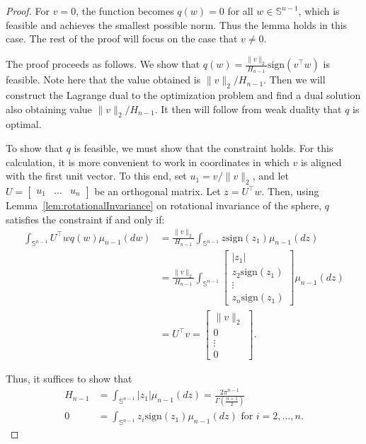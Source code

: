 \documentclass[twoside]{article}
\theoremstyle{definition}
\renewcommand{\S}{\mathbb{S}}
\newcommand{\sign}{\mathrm{sign}}
\newcommand{\1}[1]{\scalebox{1.25}{$\mathds{1}$}\left[#1\right]}
\begin{document}
\begin{proof}
For $v=0$, the function becomes $q(w)=0$ for all $w\in \S^{n-1}$, which is feasible and achieves the smallest possible norm. Thus the lemma holds in this case. The rest of the proof will focus on the case that $v\ne 0$.

The proof proceeds as follows. We show that $q(w)=\frac{\|v\|_2}{H_{n-1}}\sign(v^\top w)$ is feasible. Note  here that the value obtained is $\|v\|_2/H_{n-1}.$ Then we will construct the Lagrange dual to the optimization problem and find a dual solution also obtaining value $\|v\|_2/H_{n-1}.$ It then will follow from weak duality that $q$ is optimal. 

To show that $q$ is feasible, we must show that the constraint holds. For this calculation, it is more convenient to work in coordinates in which $v$ is aligned with the first unit vector. To this end, set $u_1=v/\|v\|_2$, and let $U=\begin{bmatrix}u_1 & \ldots & u_n\end{bmatrix}$ be an orthogonal matrix. Let $z=U^\top w$. Then, using Lemma~\ref{lem:rotationalInvariance} on rotational invariance of the sphere, $q$ satisfies the constraint if and only if:
\begin{align*}
\int_{\S^{n-1}}U^\top w q(w)\mu_{n-1}(dw)&=
\frac{\|v\|_2}{H_{n-1}}\int_{\S^{n-1}}z\sign(z_1)\mu_{n-1}(dz)\\
&=\frac{\|v\|_2}{H_{n-1}}\int_{\S^{n-1}}
\begin{bmatrix}
|z_1|\\
z_2 \sign(z_1) \\
\vdots \\
z_n\sign(z_1)
\end{bmatrix}
\mu_{n-1}(dz) \\
&=U^\top v = \begin{bmatrix}
\|v\|_2 \\
0 \\
\vdots \\
0
\end{bmatrix}.
\end{align*}

Thus, it suffices to show that 
\begin{align}
\label{eq:coordinateIntegral}
H_{n-1}&=\int_{\S^{n-1}}|z_1|\mu_{n-1}(dz) = \frac{2\pi^{n-1}}{\Gamma\left(\frac{n+1
}{2}\right)} \\
\label{eq:signOrthogonal}
0&=\int_{\S^{n-1}}z_i\sign(z_1)\mu_{n-1}(dz) \textrm{ for } i=2,\ldots,n.
\end{align}


\end{proof}
\end{document}
